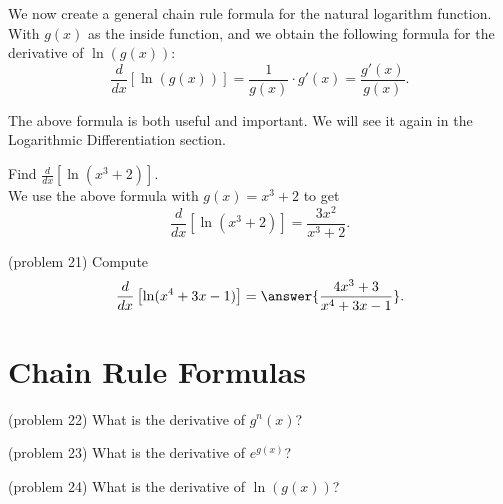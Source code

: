 \documentclass[handout]{ximera}
\begin{document}
We now create a general chain rule formula for the natural logarithm function.  
With $g(x)$ as the inside function, and we obtain the following formula for the derivative of $\ln(g(x))$:
\[
\frac{d}{dx} \left[\ln(g(x))\right] = \frac{1}{g(x)}\cdot g'(x) = \frac{g'(x)}{g(x)}.
\]


The above formula is both useful and important.  We will see it again in the Logarithmic Differentiation section.

\begin{example}[example 21]
 Find $\frac{d}{dx} \left[\ln(x^3 + 2)\right]$.\\
 
We use the above formula with $g(x) = x^3 + 2$ to get
\[
\frac{d}{dx} \left[\ln(x^3 + 2)\right] = \frac{3x^2}{x^3 + 2}.
\]
\end{example}

\begin{foldable}
\end{foldable}

\begin{problem}(problem 21)
Compute 
\[
\frac{d}{dx} \left[\ln(x^4 + 3x - 1)\right] = \answer{\frac{4x^3 + 3}{x^4 + 3x -1}}.
\]
\end{problem}

\section{Chain Rule Formulas}
\begin{problem}(problem 22)
What is the derivative of $g^n(x)$?
\begin{multipleChoice}
\end{multipleChoice}
\end{problem}

\begin{problem}(problem 23)
What is the derivative of $e^{g(x)}$?
\begin{multipleChoice}
\end{multipleChoice}
\end{problem}

\begin{problem}(problem 24)
What is the derivative of $\ln(g(x))$?
\begin{multipleChoice}
\end{multipleChoice}
\end{problem}
\end{document}
